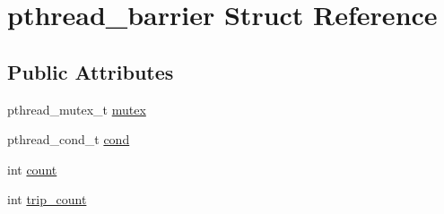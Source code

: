 \hypertarget{structpthread__barrier}{\section{pthread\-\_\-barrier Struct Reference}
\label{structpthread__barrier}
}
\subsection*{Public Attributes}
\begin{DoxyCompactItemize}
\item 
pthread\-\_\-mutex\-\_\-t \hyperlink{structpthread__barrier_aebedbcf959b1296f0d8b1164d4d46658}{mutex}
\item 
pthread\-\_\-cond\-\_\-t \hyperlink{structpthread__barrier_a4a4480c72b3ff4dda0bbb2f3cccff810}{cond}
\item 
int \hyperlink{structpthread__barrier_a991aa7493d99b8c4bae94f9a579e6173}{count}
\item 
int \hyperlink{structpthread__barrier_a947854bc107b3e00b060cee8fb9ca1fd}{trip\-\_\-count}
\end{DoxyCompactItemize}


